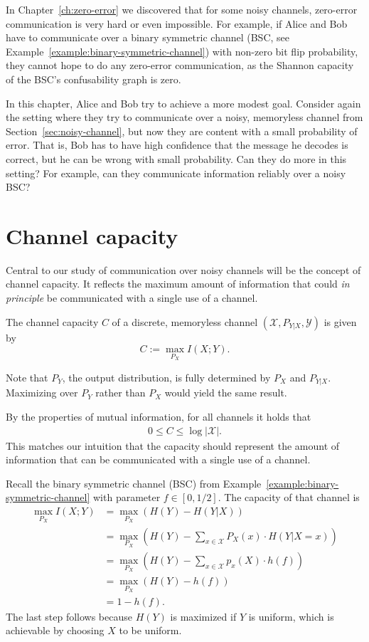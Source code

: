 

In Chapter~\ref{ch:zero-error} we discovered that for some noisy channels, zero-error communication is very hard or even impossible. For example, if Alice and Bob have to communicate over a binary symmetric channel (BSC, see Example~\ref{example:binary-symmetric-channel}) with non-zero bit flip probability, they cannot hope to do any zero-error communication, as the Shannon capacity of the BSC's confusability graph is zero.

In this chapter, Alice and Bob try to achieve a more modest goal. Consider again the setting where they try to communicate over a noisy, memoryless channel from Section~\ref{sec:noisy-channel}, but now they are content with a small probability of error. That is, Bob has to have high confidence that the message he decodes is correct, but he can be wrong with small probability. Can they do more in this setting? For example, can they communicate information reliably over a noisy BSC?

\section{Channel capacity}
Central to our study of communication over noisy channels will be the concept of channel capacity. It reflects the maximum amount of information that could \emph{in principle} be communicated with a single use of a channel.

\begin{definition}
The channel capacity $C$ of a discrete, memoryless channel $(\mathcal{X}, P_{Y|X}, \mathcal{Y})$ is given by
\[
C:= \max_{P_X} I(X;Y).
\]
\end{definition}
Note that $P_Y$, the output distribution, is fully determined by $P_X$ and $P_{Y|X}$. Maximizing over $P_Y$ rather than $P_X$ would yield the same result.

By the properties of mutual information, for all channels it holds that
\begin{align}
0 \leq C \leq \log|\mathcal{X}|.
\end{align}
This matches our intuition that the capacity should represent the amount of information that can be communicated with a single use of a channel.

\begin{example}
Recall the binary symmetric channel (BSC) from Example~\ref{example:binary-symmetric-channel} with parameter $f \in [0,1/2]$. The capacity of that channel is
\begin{align*}
\max_{P_X} I(X;Y) &= \max_{P_X} \left( H(Y) - H(Y|X)\right)\\
&= \max_{P_X} \left( H(Y) - \sum_{x \in \mathcal{X}} P_X(x) \cdot H(Y|X=x)\right)\\
&= \max_{P_X} \left( H(Y) - \sum_{x \in \mathcal{X}} p_x(X) \cdot h(f)\right)\\
&= \max_{P_X} \left( H(Y) - h(f)\right)\\
&= 1- h(f).
\end{align*}
The last step follows because $H(Y)$ is maximized if $Y$ is uniform, which is achievable by choosing $X$ to be uniform.
\end{example}

